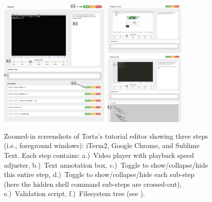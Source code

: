 \begin{figure}

\includegraphics[width=0.488\textwidth]{figures/torta/editor-iterm2.png}
\hspace{6em}
\includegraphics[width=0.359\textwidth]{figures/torta/editor-sublime-chrome.png}

\caption{Zoomed-in screenshots of Torta's tutorial editor showing three
steps (i.e., foreground windows): iTerm2, Google Chrome, and Sublime
Text. Each step contains:
a.)~Video player with playback speed adjuster,
b.)~Text annotation box,
c.)~Toggle to show/collapse/hide this entire step,
d.)~Toggle to show/collapse/hide each sub-step (here the hidden shell command
sub-steps are crossed-out),
e.)~Validation script,
f.)~Filesystem tree (see ).}

\label{fig:torta-editor}
\end{figure}



